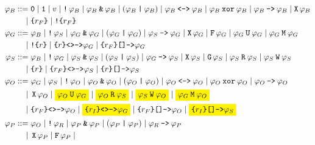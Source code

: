 \documentclass[a4paper,twoside,10pt,DIV=12]{scrreprt}
\DeclareMathOperator{\F}{\texttt{F}}
\DeclareMathOperator{\G}{\texttt{G}}
\newcommand{\U}{\mathbin{\texttt{U}}}
\newcommand{\R}{\mathbin{\texttt{R}}}
\DeclareMathOperator{\X}{\texttt{X}}
\newcommand{\M}{\mathbin{\texttt{M}}}
\newcommand{\W}{\mathbin{\texttt{W}}}
\DeclareMathOperator{\NOT}{\texttt{!}}
\newcommand{\XOR}{\mathbin{\texttt{xor}}}
\newcommand{\IMPLIES}{\mathbin{\texttt{->}}}
\newcommand{\EQUIV}{\mathbin{\texttt{<->}}}
\newcommand{\OR}{\mathbin{\texttt{|}}}
\newcommand{\AND}{\mathbin{\texttt{\&}}}
\newcommand{\0}{\texttt{0}}
\newcommand{\1}{\texttt{1}}
\newcommand{\Esuffix}{\texttt{<>->}}
\newcommand{\Asuffix}{\texttt{[]->}}
\newcommand{\sere}[1]{\texttt{\{}#1\texttt{\}}}
\newcommand{\nsere}[1]{\texttt{!\{}#1\texttt{\}}}
\begin{document}
\begin{align*}
  \varphi_B ::={}& \0\mid\1\mid v\mid\NOT\varphi_B\mid\varphi_B\AND\varphi_B
                   \mid(\varphi_B\OR\varphi_B)\mid\varphi_B\EQUIV\varphi_B
                   \mid\varphi_B\XOR\varphi_B\mid\varphi_B\IMPLIES\varphi_B
                   \mid\X\varphi_B\\
               \mid{}& \sere{r_F}\mid \nsere{r_F}\\
  \varphi_G ::={}& \varphi_B\mid \NOT\varphi_S\mid
                   \varphi_G\AND \varphi_G\mid (\varphi_G\OR \varphi_G)
                   \mid\varphi_S\IMPLIES\varphi_G\mid
                   \X\varphi_G \mid \F\varphi_G\mid
                   \varphi_G\U\varphi_G\mid \varphi_G\M\varphi_G\\
           \mid{}& \nsere{r}\mid
                   \sere{r}\Esuffix \varphi_G\mid
                   \sere{r_F}\Asuffix \varphi_G \\
  \varphi_S ::={}& \varphi_B\mid \NOT\varphi_G\mid
                   \varphi_S\AND \varphi_S\mid (\varphi_S\OR \varphi_S)
                   \mid\varphi_G\IMPLIES\varphi_S\mid
                   \X\varphi_S \mid \G\varphi_S\mid
                   \varphi_S\R\varphi_S\mid \varphi_S\W\varphi_S\\
           \mid{}& \sere{r}\mid
                   \sere{r_F}\Esuffix \varphi_S\mid
                   \sere{r}\Asuffix \varphi_S\\
  \varphi_O ::={}& \varphi_G \mid \varphi_S\mid \NOT\varphi_O\mid
                   \varphi_O\AND \varphi_O\mid (\varphi_O\OR \varphi_O)\mid
                   \varphi_O\EQUIV \varphi_O\mid \varphi_O\XOR \varphi_O\mid
                   \varphi_O\IMPLIES \varphi_O\\
           \mid{}& \X\varphi_O \mid
                   \colorbox{yellow}{$\varphi_O\U\varphi_G$}\mid
                   \colorbox{yellow}{$\varphi_O\R\varphi_S$}\mid
                   \colorbox{yellow}{$\varphi_S\W\varphi_O$}\mid
                   \colorbox{yellow}{$\varphi_G\M\varphi_O$}\\
           \mid{}& \sere{r_F}\Esuffix \varphi_O \mid \colorbox{yellow}{$\sere{r_I}\Esuffix \varphi_G$}\mid
                   \sere{r_F}\Asuffix \varphi_O\mid
                   \colorbox{yellow}{$\sere{r_I}\Asuffix \varphi_S$}\\
  \varphi_P ::={}& \varphi_O \mid \NOT\varphi_R\mid
                   \varphi_P\AND \varphi_P\mid (\varphi_P\OR \varphi_P)\mid
                   \varphi_R\IMPLIES \varphi_P\\
           \mid{}& \X\varphi_P \mid \F\varphi_P \mid

\end{align*}
\end{document}
